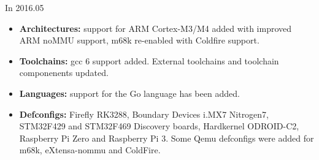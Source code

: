 \begin{frame}{In 2016.05}
  \begin{itemize}
  \item {\bf Architectures:} support for ARM Cortex-M3/M4 added with
    improved ARM noMMU support, m68k re-enabled with Coldfire support.
  \item {\bf Toolchains:} gcc 6 support added. External toolchains and
    toolchain componenents updated.
  \item {\bf Languages:} support for the Go language has been added.
  \item {\bf Defconfigs:} Firefly RK3288, Boundary Devices i.MX7
    Nitrogen7, STM32F429 and STM32F469 Discovery boards, Hardkernel
    ODROID-C2, Raspberry Pi Zero and Raspberry Pi 3. Some Qemu
    defconfigs were added for m68k, eXtensa-nommu and ColdFire.
  \end{itemize}
\end{frame}